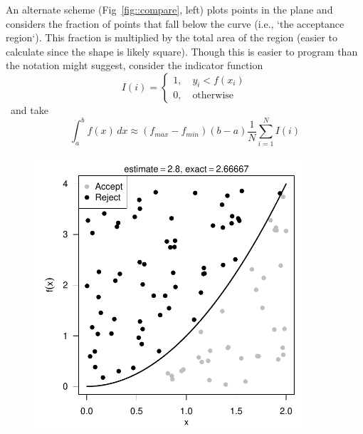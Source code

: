 \documentclass[11pt]{article}
\begin{document}
An alternate scheme (Fig~\ref{fig::compare}, left) plots points in the plane and considers the fraction of points that fall below the curve (i.e., `the acceptance region`). This fraction is multiplied by the total area of the region (easier to calculate since the shape is likely square). Though this is easier to program than the notation might suggest, consider the indicator function \[I(i) = \begin{cases}1, \quad y_i < f(x_i)\\0, \quad\text{otherwise}\end{cases}\]~and take~\[\int_a^b f(x)\,dx \approx(f_{max}-f_{min})(b-a)\dfrac{1}{N} \sum_{i=1}^N I(i)\]
%
\begin{figure}[h!]\centering
\begin{minipage}{0.48\textwidth}\centering
\includegraphics[width=0.9\textwidth]{rejection.pdf}

\end{minipage}
\begin{minipage}{0.48\textwidth}


\end{minipage}
\end{figure}
\end{document}
